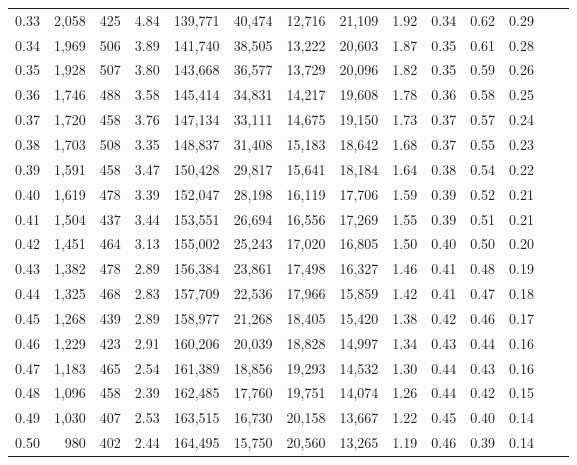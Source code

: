 \begin{tabular}{rrrrrrrrrrrrrr}
0.33 &  2,058 &  425 &    4.84 &  139,771 &   40,474 &  12,716 &  21,109 &  1.92 &  0.34 &  0.62 &      0.29 \\
0.34 &  1,969 &  506 &    3.89 &  141,740 &   38,505 &  13,222 &  20,603 &  1.87 &  0.35 &  0.61 &      0.28 \\
0.35 &  1,928 &  507 &    3.80 &  143,668 &   36,577 &  13,729 &  20,096 &  1.82 &  0.35 &  0.59 &      0.26 \\
0.36 &  1,746 &  488 &    3.58 &  145,414 &   34,831 &  14,217 &  19,608 &  1.78 &  0.36 &  0.58 &      0.25 \\
0.37 &  1,720 &  458 &    3.76 &  147,134 &   33,111 &  14,675 &  19,150 &  1.73 &  0.37 &  0.57 &      0.24 \\
0.38 &  1,703 &  508 &    3.35 &  148,837 &   31,408 &  15,183 &  18,642 &  1.68 &  0.37 &  0.55 &      0.23 \\
0.39 &  1,591 &  458 &    3.47 &  150,428 &   29,817 &  15,641 &  18,184 &  1.64 &  0.38 &  0.54 &      0.22 \\
0.40 &  1,619 &  478 &    3.39 &  152,047 &   28,198 &  16,119 &  17,706 &  1.59 &  0.39 &  0.52 &      0.21 \\
0.41 &  1,504 &  437 &    3.44 &  153,551 &   26,694 &  16,556 &  17,269 &  1.55 &  0.39 &  0.51 &      0.21 \\
0.42 &  1,451 &  464 &    3.13 &  155,002 &   25,243 &  17,020 &  16,805 &  1.50 &  0.40 &  0.50 &      0.20 \\
0.43 &  1,382 &  478 &    2.89 &  156,384 &   23,861 &  17,498 &  16,327 &  1.46 &  0.41 &  0.48 &      0.19 \\
0.44 &  1,325 &  468 &    2.83 &  157,709 &   22,536 &  17,966 &  15,859 &  1.42 &  0.41 &  0.47 &      0.18 \\
0.45 &  1,268 &  439 &    2.89 &  158,977 &   21,268 &  18,405 &  15,420 &  1.38 &  0.42 &  0.46 &      0.17 \\
0.46 &  1,229 &  423 &    2.91 &  160,206 &   20,039 &  18,828 &  14,997 &  1.34 &  0.43 &  0.44 &      0.16 \\
0.47 &  1,183 &  465 &    2.54 &  161,389 &   18,856 &  19,293 &  14,532 &  1.30 &  0.44 &  0.43 &      0.16 \\
0.48 &  1,096 &  458 &    2.39 &  162,485 &   17,760 &  19,751 &  14,074 &  1.26 &  0.44 &  0.42 &      0.15 \\
0.49 &  1,030 &  407 &    2.53 &  163,515 &   16,730 &  20,158 &  13,667 &  1.22 &  0.45 &  0.40 &      0.14 \\
0.50 &    980 &  402 &    2.44 &  164,495 &   15,750 &  20,560 &  13,265 &  1.19 &  0.46 &  0.39 &      0.14 \\

\end{tabular}
